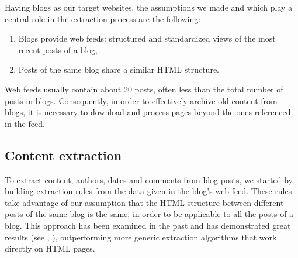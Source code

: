
Having blogs as our target websites, the assumptions we made and which play a central role in the extraction process are the following:
\begin{enumerate}[label={(\arabic*)}]
  \item\label{havefeedAssum} Blogs provide web feeds: structured and standardized views of the most recent posts of a blog,
  \item\label{similarhtmlAssum} Posts of the same blog share a similar HTML structure.
\end{enumerate}
Web feeds usually contain about 20 posts\cite{oita2010}, often less than the total number of posts in blogs. Consequently, in order to effectively archive old content from blogs, it is necessary to download and process pages beyond the ones referenced in the feed.

\subsection{Content extraction}
To extract content, authors, dates and comments from blog posts, we started by building extraction rules from the data given in the blog's web feed. These rules take advantage of our assumption that the HTML structure between different posts of the same blog is the same, in order to be applicable to all the posts of a blog. This approach has been examined in the past and has demonstrated great results (see \cite{gkotsis2013}, \cite{oita2010}), outperforming more generic extraction algorithms that work directly on HTML pages.

